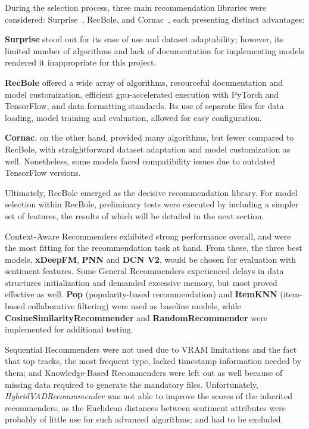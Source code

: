 During the selection process, three main recommendation libraries were considered: Surprise~\cite{SURPRISE}, RecBole, and Cornac~\cite{CORNAC}, each presenting distinct advantages:
\begin{compactitem}[\textbullet] 
    \item \textbf{Surprise} stood out for its ease of use and dataset adaptability; however, its limited number of algorithms and lack of documentation for implementing models rendered it inappropriate for this project.
    \item \textbf{RecBole} offered a wide array of algorithms, resourceful documentation and model customization, efficient \acs{gpu}-accelerated execution with PyTorch and TensorFlow, and data formatting standards. Its use of separate files for data loading, model training and evaluation, allowed for easy configuration.
    \item \textbf{Cornac}, on the other hand, provided many algorithms, but fewer compared to RecBole, with straightforward dataset adaptation and model customization as well. Nonetheless, some models faced compatibility issues due to outdated TensorFlow versions.
\end{compactitem}

Ultimately, RecBole emerged as the decisive recommendation library. For model selection within RecBole, preliminary tests were executed by including a simpler set of features, the results of which will be detailed in the next section.

Context-Aware Recommenders exhibited strong performance overall, and were the most fitting for the recommendation task at hand. From these, the three best models, \textbf{xDeepFM}, \textbf{PNN} and \textbf{DCN V2}, would be chosen for evaluation with sentiment features. Some General Recommenders experienced delays in data structures initialization and demanded excessive memory, but most proved effective as well. \textbf{Pop} (popularity-based recommendation) and \textbf{ItemKNN} (item-based collaborative filtering) were used as baseline models, while \textbf{CosineSimilarityRecommender} and \textbf{RandomRecommender} were implemented for additional testing.

Sequential Recommenders were not used due to VRAM limitations and the fact that top tracks, the most frequent type, lacked timestamp information needed by them; and Knowledge-Based Recommenders were left out as well because of missing data required to generate the mandatory files. Unfortunately, \emph{HybridVADRecommmender} was not able to improve the scores of the inherited recommenders, as the Euclidean distances between sentiment attributes were probably of little use for such advanced algorithms; and had to be excluded.